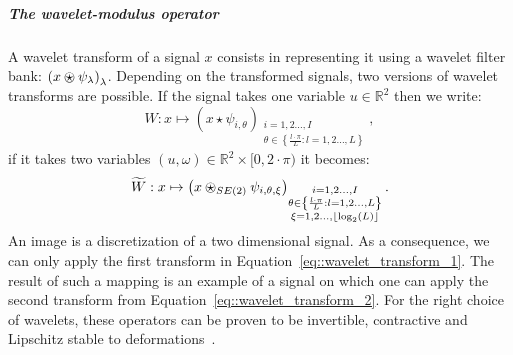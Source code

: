                 \subparagraph{The wavelet-modulus operator}
                    A wavelet transform of a signal $x$ consists in representing it using a wavelet filter bank: $\left(x\ostar\psi_{\lambda}\right)_{\lambda}$.
                    Depending on the transformed signals, two versions of wavelet transforms are possible.
                    If the signal takes one variable $u \in \mathbb{R}^2$ then we write:
                    \begin{equation}
                        \label{eq::wavelet_transform_1}
                        W: x \mapsto \left(x\star\psi_{i, \theta}\right)_{\substack{i=1, 2 \dots, I \\ \theta \in \left\{\frac{l\cdot\pi}{L}: l=1,2\dots,L\right\}}},
                    \end{equation}
                    if it takes two variables $(u, \omega) \in \mathbb{R}^2 \times [0, 2\cdot\pi)$ it becomes:
                    \begin{equation}
                        \label{eq::wavelet_transform_2}
                        \widetilde{W}: x \mapsto \left(x\ostar_{SE(2)}\psi_{i, \theta, \xi}\right)_{\substack{i=1, 2 \dots, I \\ \theta \in \left\{\frac{l\cdot\pi}{L}: l=1,2\dots,L\right\}\\\xi=1,2\dots,\lfloor\log_2(L)\rfloor}}.
                    \end{equation}
                    An image is a discretization of a two dimensional signal.
                    As a consequence, we can only apply the first transform in Equation~\ref{eq::wavelet_transform_1}.
                    The result of such a mapping is an example of a signal on which one can apply the second transform from Equation~\ref{eq::wavelet_transform_2}.
                    For the right choice of wavelets, these operators can be proven to be invertible, contractive and Lipschitz stable to deformations~\parencite{mallat2012group}.\\

